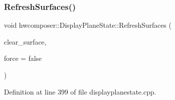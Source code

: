 \subsubsection{\texorpdfstring{Refresh\+Surfaces()}{RefreshSurfaces()}}
{\footnotesize\ttfamily void hwcomposer\+::\+Display\+Plane\+State\+::\+Refresh\+Surfaces (\begin{DoxyParamCaption}\item[{\mbox{\hyperlink{classhwcomposer_1_1NativeSurface_a0d0f955fc1e9f95c9684e9524f4217d6}{Native\+Surface\+::\+Clear\+Type}}}]{clear\+\_\+surface,  }\item[{bool}]{force = {\ttfamily false} }\end{DoxyParamCaption})}



Definition at line 399 of file displayplanestate.\+cpp.


